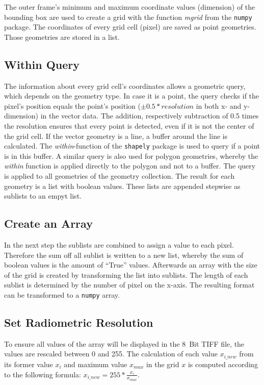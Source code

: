 \documentclass[10pt, a4paper]{article}
\begin{document}
	The outer frame's minimum and maximum coordinate values (dimension) of the bounding box are used to create a grid with the function \textit{mgrid} from the \texttt{numpy} package. The coordinates of every grid cell (pixel) are saved as point geometries. Those geometries are stored in a list.
	
	\subsection*{Within Query}\label{within}
	The information about every grid cell's coordinates allows a geometric query, which depends on the geometry type. 
	In case it is a point, the query checks if the pixel's position  equals the point's position ($\pm 0.5*resolution$ in both x- and y-dimension) in the vector data. The addition, respectively subtraction of 0.5 times the resolution ensures that every point is detected, even if it is not the center of the grid cell. 
	If the vector geometry is a line, a buffer around the line is calculated. The \textit{within}-function of the \texttt{shapely} package is used to query if a point is in this buffer. A similar query is also used for polygon geometries, whereby the \textit{within} function is applied directly to the polygon and not to a buffer.
	The query is applied to all geometries of the geometry collection. The result for each geometry is a list with boolean values. These lists are appended stepwise as sublists to an empyt list.
	
	\subsection*{Create an Array}
	In the next step the sublists are combined to assign a value to each pixel. Therefore the sum off all sublist is written to a new list, whereby the sum of boolean values is the amount of ``True'' values.  Afterwards an array with the size of the grid is created by transforming the list into sublists. The length of each sublist is determined by the number of pixel on the x-axis. The resulting format can be transformed to a \texttt{numpy} array.
	
	\subsection*{Set Radiometric Resolution}
	To ensure all values of the array will be displayed in the \SI{8}{Bit} TIFF file, the values are rescaled between 0 and 255. The calculation of each value $x_{i\_new}$ from its former value $x_i$ and maximum value $x_{max}$ in the grid $x$ is computed according to the following formula:
	$ x_{i\_new} = 255 * \frac{x_i}{x_{max}} $.
	
\end{document}
